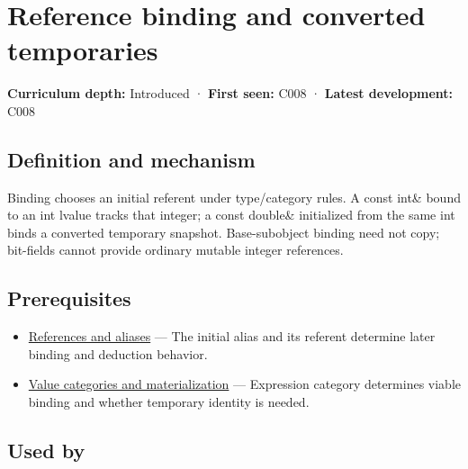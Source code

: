 \hypertarget{appendix-37856d997bb0}{}\label{referencestart:appendix-37856d997bb0}
\section{Reference binding and converted temporaries}\label{appendix-37856d997bb0-reference-binding-and-converted-temporaries}

\hypertarget{appendix-37856d997bb0-reference-binding-and-converted-temporaries}{}

\textbf{Curriculum depth:} Introduced · \textbf{First seen:} C008 · \textbf{Latest development:} C008

\begin{allmightroledefinition}

\subsection{Definition and mechanism}\label{appendix-37856d997bb0-definition-and-mechanism}

\hypertarget{appendix-37856d997bb0-definition-and-mechanism}{}

Binding chooses an initial referent under type/category rules. A const int\& bound to an int lvalue tracks that integer; a const double\& initialized from the same int binds a converted temporary snapshot. Base-subobject binding need not copy; bit-fields cannot provide ordinary mutable integer references.

\end{allmightroledefinition}

\subsection{Prerequisites}\label{appendix-37856d997bb0-prerequisites}

\hypertarget{appendix-37856d997bb0-prerequisites}{}

\begin{itemize}
\tightlist
\item
  \hyperref[appendix-d6d562ca9fbb]{References and aliases} --- The initial alias and its referent determine later binding and deduction behavior.
\item
  \hyperref[appendix-1121b30eaeb0]{Value categories and materialization} --- Expression category determines viable binding and whether temporary identity is needed.
\end{itemize}

\subsection{Used by}\label{appendix-37856d997bb0-used-by}

